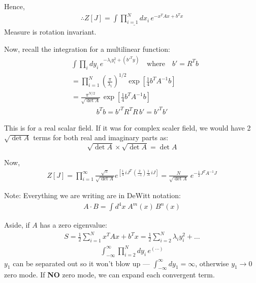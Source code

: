 \documentclass[14pt]{article} %
\begin{document}
Hence,
\begin{align*}
\therefore Z[J] =  \int \underline{\prod_{i=1}^N dx_i} \, e^{-x^T A x + b^T x}
\end{align*}
Measure is rotation invariant.

Now, recall the integration for a multilinear function:
\begin{align*}
&\int \prod_{i} dy_i \, e^{-\lambda_i y_i^2 + (b'^T y)} 
\quad \text{where} \quad b' = R^T b
\\
&= \prod_{i=1}^N \left( \frac{\pi}{\lambda_i} \right)^{1/2} 
\exp\left[ \frac{1}{4} b^T A^{-1} b \right]
\\
&= \frac{\pi ^ {N/2}}{\sqrt{\det A}} \,\exp\left[ \frac{1}{4} b^T A^{-1} b \right]
\end{align*}
\begin{align*}
b^Tb = b'^T R^T R\, b' = b'^T b'
\end{align*}
\begin{tcolorbox}
This is for a real scalar field. If it was for complex scaler field, we would have 2 $\sqrt{\det A}$ terms for both real and imaginary parts as: 
$$\sqrt{\det A} \times\sqrt{\det A} = \det A$$
\end{tcolorbox}
Now,
\begin{align*}
Z[J] = \prod_{i=1}^\infty \frac{\sqrt{\pi}}{{\sqrt{\det A}}}
e^{ \left[ \frac14 \,iJ^T\, \left( \frac{2}{-i} \right) \frac1A \,iJ \right] }
= \frac{N}{\sqrt{\det A}} \;
e^{ -\frac12 J^T A^{-1} J }
\end{align*}
\begin{tcolorbox}
Note: Everything we are writing are in DeWitt notation:
\begin{align*}
A \cdot B = \int d^4x \; A^m(x) \, B^n(x)
\end{align*} 
\end{tcolorbox}
Aside, if $A$ has a zero eigenvalue:
\begin{align*}
S = \frac12 \sum_{i=1}^N x^T A x + b^T x
= \frac12 \sum_{i=2}^N \lambda_i y_i^2 + \dots
\end{align*}
\begin{align*}
\int_{-\infty}^\infty \prod_{i=2}^N dy_i \, e^{(\cdots)}
\end{align*}
$y_1$ can be separated out so it won't blow up — $\int_{-\infty}^\infty dy_1 = \infty$, otherwise $y_1 \to 0$ zero mode.  
If \textbf{NO} zero mode, we can expand each convergent term.
\\
\end{document}
